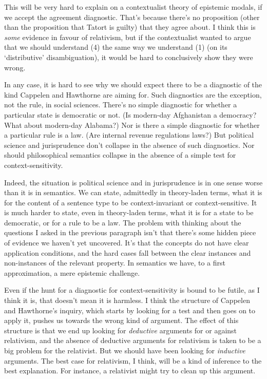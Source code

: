 
\noindent This will be very hard to explain on a contextualist theory of epistemic modals, if we accept the agreement diagnostic. That's because there's no proposition (other than the proposition that Tatort is guilty) that they agree about. I think this is \textit{some} evidence in favour of relativism, but if the contextualist wanted to argue that we should understand (4) the same way we understand (1) (on its `distributive' disambiguation), it would be hard to conclusively show they were wrong.

In any case, it is hard to see why we should expect there to be a diagnostic of the kind Cappelen and Hawthorne are aiming for. Such diagnostics are the exception, not the rule, in social sciences. There's no simple diagnostic for whether a particular state is democratic or not. (Is modern-day Afghanistan a democracy? What about modern-day Alabama?) Nor is there a simple diagnostic for whether a particular rule is a law. (Are internal revenue regulations laws?) But political science and jurisprudence don't collapse in the absence of such diagnostics. Nor should philosophical semantics collapse in the absence of a simple test for context-sensitivity.

Indeed, the situation is political science and in jurisprudence is in one sense worse than it is in semantics. We can state, admittedly in theory-laden terms, what it is for the content of a sentence type to be context-invariant or context-sensitive. It is much harder to state, even in theory-laden terms, what it is for a state to be democratic, or for a rule to be a law. The problem with thinking about the questions I asked in the previous paragraph isn't that there's some hidden piece of evidence we haven't yet uncovered. It's that the concepts do not have clear application conditions, and the hard cases fall between the clear instances and non-instances of the relevant property. In semantics we have, to a first approximation, a mere epistemic challenge.

Even if the hunt for a diagnostic for context-sensitivity is bound to be futile, as I think it is, that doesn't mean it is harmless. I think the structure of Cappelen and Hawthorne's inquiry, which starts by looking for a test and then goes on to apply it, pushes us towards the wrong kind of argument. The effect of this structure is that we end up looking for \textit{deductive} arguments for or against relativism, and the absence of deductive arguments for relativism is taken to be a big problem for the relativist. But we should have been looking for \textit{inductive} arguments. The best case for relativism, I think, will be a kind of inference to the best explanation. For instance, a relativist might try to clean up this argument.

